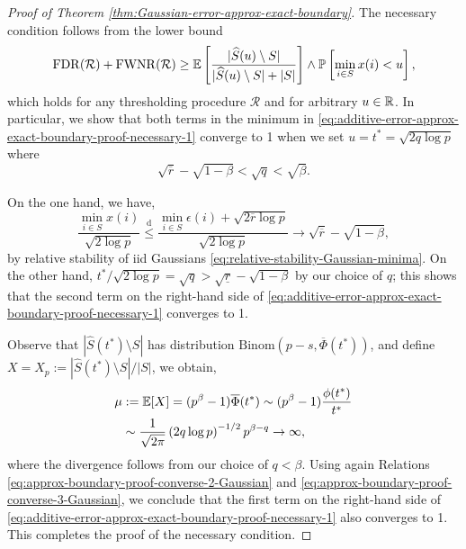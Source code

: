 \begin{proof}[Proof of Theorem \ref{thm:Gaussian-error-approx-exact-boundary}]
The necessary condition follows from the lower bound
\begin{equation} \label{eq:additive-error-approx-exact-boundary-proof-necessary-1}
    \mathrm{FDR}(\mathcal{R}) + \mathrm{FWNR}(\mathcal{R}) \ge {\mathbb E}\left[\frac{|\widehat{S}(u)\setminus S|}{|\widehat{S}(u)\setminus S| + |S|}\right] \wedge 
    {\mathbb P}\left[\min_{i\in S}x(i)<u\right],
\end{equation}
which holds for any thresholding procedure $\mathcal{R}$ and for arbitrary $u\in\mathbb R$.
In particular, we show that both terms in the minimum in \eqref{eq:additive-error-approx-exact-boundary-proof-necessary-1} converge to 1 when we set $u=t^*=\sqrt{2q\log{p}}$ where 
\begin{equation}
\sqrt{\overline{r}}-\sqrt{1-\beta}<\sqrt{q}<\sqrt{\beta}.
\end{equation}

On the one hand, we have,
$$
\frac{\min_{i\in S}x(i)}{\sqrt{2\log{p}}} 
\stackrel{\mathrm{d}}{\le} \frac{\min_{i\in S}\epsilon(i)+\sqrt{2\overline{r}\log{p}}}{\sqrt{2\log{p}}} 
\to \sqrt{\overline{r}}-\sqrt{1-\beta},
$$
by relative stability of iid Gaussians \eqref{eq:relative-stability-Gaussian-minima}. On the other hand, ${t^*}/{\sqrt{2\log{p}}}=\sqrt{q}>\sqrt{\underline{r}}-\sqrt{1-\beta}$ by our choice of ${q}$;
this shows that the second term on the right-hand side of \eqref{eq:additive-error-approx-exact-boundary-proof-necessary-1} converges to 1.

Observe that $|\widehat{S}(t^*)\setminus{S}|$ has distribution $\text{Binom}(p-s, \overline{\Phi}(t^*))$, and define $X = X_p := {|\widehat{S}(t^*)\setminus{S}|}/{|S|}$, we obtain,
\begin{align*}
    \mu &:= {\mathbb E}[X] = (p^\beta-1)\overline{\Phi}(t^*) 
    \sim (p^\beta-1)\frac{\phi(t^*)}{t^*} \\
    &\sim \frac{1}{\sqrt{2\pi}}\left(2q\log{p}\right)^{-1/2}p^{\beta-q}\to\infty,
\end{align*}
where the divergence follows from our choice of $q<\beta$.
Using again Relations \eqref{eq:approx-boundary-proof-converse-2-Gaussian} and \eqref{eq:approx-boundary-proof-converse-3-Gaussian}, we conclude that the first term on the right-hand side of \eqref{eq:additive-error-approx-exact-boundary-proof-necessary-1} also converges to 1.
This completes the proof of the necessary condition.
\end{proof}
